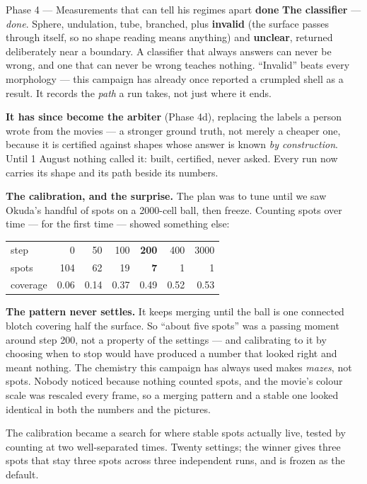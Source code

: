 \documentclass[11pt,a4paper]{article}
\newcommand{\dn}{\textcolor{good}{\textbf{done}}}
\begin{document}
\begin{phasebox}{Phase 4 --- Measurements that can tell his regimes apart \hfill \dn}
\textbf{The classifier} --- \emph{done}. Sphere, undulation, tube, branched, plus \textbf{invalid}
(the surface passes through itself, so no shape reading means anything) and \textbf{unclear},
returned deliberately near a boundary. A classifier that always answers can never be wrong, and one
that can never be wrong teaches nothing. ``Invalid'' beats every morphology --- this campaign has
already once reported a crumpled shell as a result. It records the \emph{path} a run takes, not just
where it ends.

\textbf{It has since become the arbiter} (Phase 4d), replacing the labels a person wrote from the
movies --- a stronger ground truth, not merely a cheaper one, because it is certified against
shapes whose answer is known \emph{by construction}. Until 1 August nothing called it: built,
certified, never asked. Every run now carries its shape and its path beside its numbers.

\textbf{The calibration, and the surprise.} The plan was to tune until we saw Okuda's handful of
spots on a 2000-cell ball, then freeze. Counting spots over time --- for the first time --- showed
something else:

\begin{center}\small
\begin{tabular}{@{}lrrrrrr@{}}
\toprule
step        & 0 & 50 & 100 & \textbf{200} & 400 & 3000\\
spots       & 104 & 62 & 19 & \textbf{7} & 1 & 1\\
coverage    & 0.06 & 0.14 & 0.37 & 0.49 & 0.52 & 0.53\\
\bottomrule
\end{tabular}
\end{center}

\textbf{The pattern never settles.} It keeps merging until the ball is one connected blotch covering
half the surface. So ``about five spots'' was a passing moment around step 200, not a property of
the settings --- and calibrating to it by choosing when to stop would have produced a number that
looked right and meant nothing. The chemistry this campaign has always used makes \emph{mazes}, not
spots. Nobody noticed because nothing counted spots, and the movie's colour scale was rescaled every
frame, so a merging pattern and a stable one looked identical in both the numbers and the pictures.

The calibration became a search for where stable spots actually live, tested by counting at two
well-separated times. Twenty settings; the winner gives three spots that stay three spots across
three independent runs, and is frozen as the default.
\end{phasebox}
\end{document}
